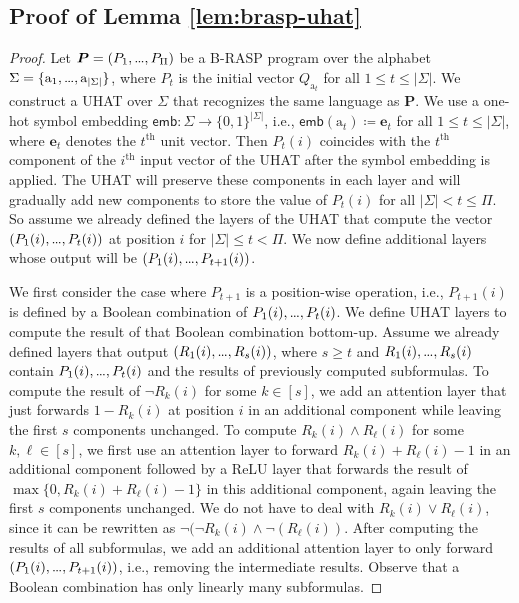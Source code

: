 \documentclass{article} %
\newcommand{\emb}{\mathsf{emb}}
\newcommand{\bnfdef}{\coloneqq}
\newcommand{\sym}[1]{\mathrm{#1}}
\newcommand{\alphabet}{\Sigma}
\newcommand{\brasp}{\boldsymbol{P}}
\newcommand{\Qprop}[1]{Q_{#1}}
\newcommand{\mydots}{%
  \ifmmode
    \mathord{.}\mkern-1mu\mathord{.}\mkern-1mu\mathord{.}%
  \else
    .\kern-0.1em.\kern-0.1em.%
  \fi
}
\renewcommand{\ldots}{\mydots}%
\renewcommand{\dots}{\mydots}%
\begin{document}
\subsection{Proof of Lemma \ref{lem:brasp-uhat}}\label{app:brasp-uhat}
\lemBraspUHAT*
\begin{proof}
Let $\brasp = (P_1,\ldots,P_\Pi)$ be a B-RASP program over the alphabet $\alphabet = \{\sym{a}_1,\dots,\sym{a}_{|\alphabet|}\}$,
where $P_t$ is the initial vector $\Qprop{\sym{a}_t}$ for all $1 \le t \le |\alphabet|$.
We construct a UHAT over $\alphabet$ that recognizes the same language as $\brasp$.
We use a one-hot symbol embedding $\emb \colon \alphabet \to \{0,1\}^{|\alphabet|}$, i.e.,
$\emb(\sym{a}_t) \bnfdef \boldsymbol{e}_t$ for all $1 \le t \le |\alphabet|$, where $\boldsymbol{e}_t$ denotes the $t^{\text{th}}$ unit vector.
Then $P_t(i)$ coincides with the $t^{\text{th}}$ component of the $i^{\text{th}}$ input vector of the UHAT after the symbol embedding is applied.
The UHAT will preserve these components in each layer and will gradually add new components
to store the value of $P_t(i)$ for all $|\alphabet| < t \le \Pi$.
So assume we already defined the layers of the UHAT that compute the vector $(P_1(i),\dots,P_t(i))$
at position $i$ for $|\alphabet| \le t < \Pi$.
We now define additional layers whose output will be $(P_1(i),\dots,P_{t+1}(i))$.

We first consider the case where $P_{t+1}$ is a position-wise operation, i.e.,
$P_{t+1}(i)$ is defined by a Boolean combination of $P_1(i),\dots,P_t(i)$.
We define UHAT layers to compute the result of that Boolean combination bottom-up.
Assume we already defined layers that output $(R_1(i),\dots,R_s(i))$,
where $s \ge t$ and $R_1(i),\dots,R_s(i)$ contain $P_1(i),\dots,P_t(i)$ and the results of previously computed subformulas.
To compute the result of $\neg R_k(i)$ for some $k \in [s]$,
we add an attention layer that just forwards $1-R_k(i)$ at position $i$ in an additional component
while leaving the first $s$ components unchanged.
To compute $R_k(i) \wedge R_\ell(i)$ for some $k,\ell \in [s]$,
we first use an attention layer to forward $R_k(i) + R_\ell(i)-1$ in an additional component
followed by a ReLU layer that forwards the result of $\max\{0,R_k(i) + R_\ell(i)-1\}$ in this additional component,
again leaving the first $s$ components unchanged.
We do not have to deal with $R_k(i) \vee R_\ell(i)$, since it can be rewritten as $\neg(\neg R_k(i) \wedge \neg(R_\ell(i))$.
After computing the results of all subformulas, we add an additional attention layer to only forward
$(P_1(i),\dots,P_{t+1}(i))$, i.e., removing the intermediate results.
Observe that a Boolean combination has only linearly many subformulas.


\end{proof}
\end{document}
